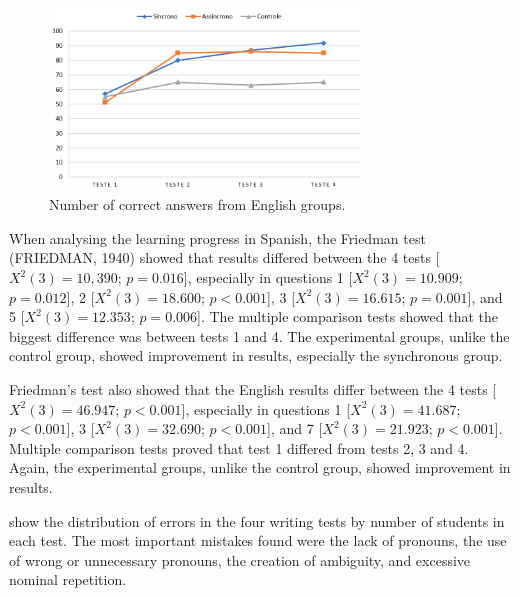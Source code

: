 \documentclass{textolivre}
\begin{document}
\begin{figure}[htbp]
 \centering
 \includegraphics[width=0.75\textwidth]{fig04.png}
 \caption{Number of correct answers from English groups.}
 \label{fig04}
\end{figure}




When analysing the learning progress in Spanish, the Friedman test
(FRIEDMAN, 1940) showed that results differed between the 4 tests
[$X^2(3) = 10,390$; $p = 0.016$], especially in questions 1 [$X^2(3) = 10.909$; 
$p = 0.012$], 2 [$X^2(3) = 18.600$; $p < 0.001$], 3
[$X^2(3) = 16.615$; $p = 0.001$], and 5 [$X^2(3) = 12.353$; $p = 0.006$].
The multiple comparison tests showed that the biggest difference was
between tests 1 and 4. The experimental groups, unlike the control
group, showed improvement in results, especially the synchronous group.

Friedman's test also showed that the English results differ between the
4 tests [$X^2(3) = 46.947$; $p < 0.001$], especially in
questions 1 [$X^2(3) = 41.687$; $p < 0.001$], 3 [$X^2(3) = 32.690$; 
$p < 0.001$], and 7 [$X^2(3) = 21.923$; $p < 0.001$]. 
Multiple comparison tests proved that test 1 differed from
tests 2, 3 and 4. Again, the experimental groups, unlike the control
group, showed improvement in results.

 show the distribution of errors in the four writing
tests by number of students in each test. The most important mistakes
found were the lack of pronouns, the use of wrong or unnecessary
pronouns, the creation of ambiguity, and excessive nominal repetition.
\end{document}
